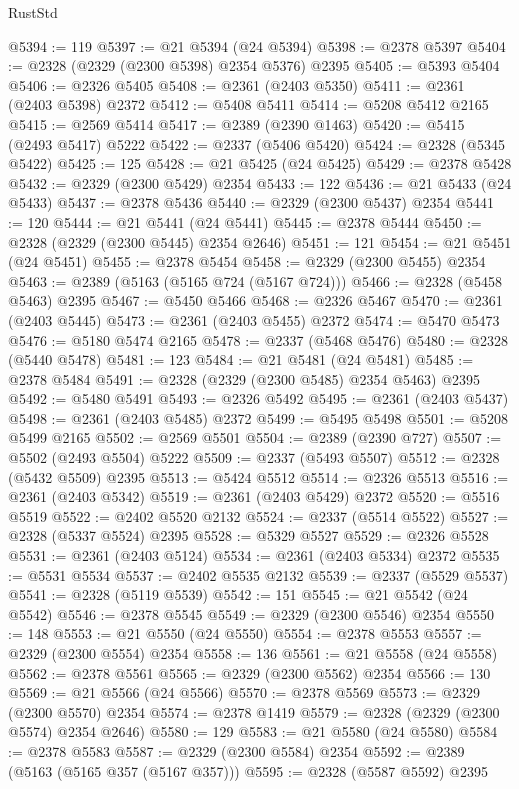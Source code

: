 \begin{lexlean}{RustStd}
\begin{coremodule}
@5394 := 119
@5397 := @21 @5394 (@24 @5394)
@5398 := @2378 @5397
@5404 := @2328 (@2329 (@2300 @5398) @2354 @5376) @2395
@5405 := @5393 @5404
@5406 := @2326 @5405
@5408 := @2361 (@2403 @5350)
@5411 := @2361 (@2403 @5398) @2372
@5412 := @5408 @5411
@5414 := @5208 @5412 @2165
@5415 := @2569 @5414
@5417 := @2389 (@2390 @1463)
@5420 := @5415 (@2493 @5417) @5222
@5422 := @2337 (@5406 @5420)
@5424 := @2328 (@5345 @5422)
@5425 := 125
@5428 := @21 @5425 (@24 @5425)
@5429 := @2378 @5428
@5432 := @2329 (@2300 @5429) @2354
@5433 := 122
@5436 := @21 @5433 (@24 @5433)
@5437 := @2378 @5436
@5440 := @2329 (@2300 @5437) @2354
@5441 := 120
@5444 := @21 @5441 (@24 @5441)
@5445 := @2378 @5444
@5450 := @2328 (@2329 (@2300 @5445) @2354 @2646)
@5451 := 121
@5454 := @21 @5451 (@24 @5451)
@5455 := @2378 @5454
@5458 := @2329 (@2300 @5455) @2354
@5463 := @2389 (@5163 (@5165 @724 (@5167 @724)))
@5466 := @2328 (@5458 @5463) @2395
@5467 := @5450 @5466
@5468 := @2326 @5467
@5470 := @2361 (@2403 @5445)
@5473 := @2361 (@2403 @5455) @2372
@5474 := @5470 @5473
@5476 := @5180 @5474 @2165
@5478 := @2337 (@5468 @5476)
@5480 := @2328 (@5440 @5478)
@5481 := 123
@5484 := @21 @5481 (@24 @5481)
@5485 := @2378 @5484
@5491 := @2328 (@2329 (@2300 @5485) @2354 @5463) @2395
@5492 := @5480 @5491
@5493 := @2326 @5492
@5495 := @2361 (@2403 @5437)
@5498 := @2361 (@2403 @5485) @2372
@5499 := @5495 @5498
@5501 := @5208 @5499 @2165
@5502 := @2569 @5501
@5504 := @2389 (@2390 @727)
@5507 := @5502 (@2493 @5504) @5222
@5509 := @2337 (@5493 @5507)
@5512 := @2328 (@5432 @5509) @2395
@5513 := @5424 @5512
@5514 := @2326 @5513
@5516 := @2361 (@2403 @5342)
@5519 := @2361 (@2403 @5429) @2372
@5520 := @5516 @5519
@5522 := @2402 @5520 @2132
@5524 := @2337 (@5514 @5522)
@5527 := @2328 (@5337 @5524) @2395
@5528 := @5329 @5527
@5529 := @2326 @5528
@5531 := @2361 (@2403 @5124)
@5534 := @2361 (@2403 @5334) @2372
@5535 := @5531 @5534
@5537 := @2402 @5535 @2132
@5539 := @2337 (@5529 @5537)
@5541 := @2328 (@5119 @5539)
@5542 := 151
@5545 := @21 @5542 (@24 @5542)
@5546 := @2378 @5545
@5549 := @2329 (@2300 @5546) @2354
@5550 := 148
@5553 := @21 @5550 (@24 @5550)
@5554 := @2378 @5553
@5557 := @2329 (@2300 @5554) @2354
@5558 := 136
@5561 := @21 @5558 (@24 @5558)
@5562 := @2378 @5561
@5565 := @2329 (@2300 @5562) @2354
@5566 := 130
@5569 := @21 @5566 (@24 @5566)
@5570 := @2378 @5569
@5573 := @2329 (@2300 @5570) @2354
@5574 := @2378 @1419
@5579 := @2328 (@2329 (@2300 @5574) @2354 @2646)
@5580 := 129
@5583 := @21 @5580 (@24 @5580)
@5584 := @2378 @5583
@5587 := @2329 (@2300 @5584) @2354
@5592 := @2389 (@5163 (@5165 @357 (@5167 @357)))
@5595 := @2328 (@5587 @5592) @2395

\end{coremodule}
\end{lexlean}
